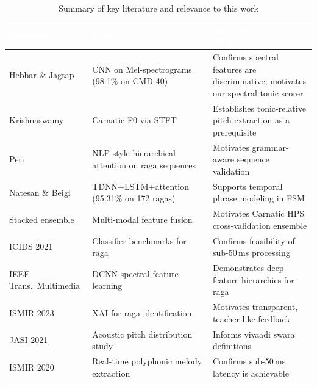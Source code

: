 \documentclass[12pt,a4paper]{report}
\numberwithin{equation}{chapter}
\begin{document}
\begin{table}[htbp]
\centering
\caption{Summary of key literature and relevance to this work}
\label{tab:lit-summary}
\setlength{\arrayrulewidth}{0.4pt}
\renewcommand{\arraystretch}{1.35}
\small
\begin{tabular}{>{\raggedright\arraybackslash}p{3.2cm}
                >{\raggedright\arraybackslash}p{3.6cm}
                >{\raggedright\arraybackslash}p{6.4cm}}
\arrayrulecolor{tableheadbg}
\toprule
\rowcolor{tableheadbg}
\textcolor{white}{\textbf{Reference}} &
\textcolor{white}{\textbf{Focus}} &
\textcolor{white}{\textbf{Relevance to this work}} \\
\midrule
\arrayrulecolor{black!15}
\rowcolor{tablerowA}
\cite{hebbar2023comparison} Hebbar \& Jagtap & CNN on Mel-spectrograms (98.1\% on CMD-40) & Confirms spectral features are discriminative; motivates our spectral tonic scorer \\
\rowcolor{tablerowB}
\cite{krishnaswamy2018application} Krishnaswamy & Carnatic F0 via STFT & Establishes tonic-relative pitch extraction as a prerequisite \\
\rowcolor{tablerowA}
\cite{peri2023applying} Peri & NLP-style hierarchical attention on raga sequences & Motivates grammar-aware sequence validation \\
\rowcolor{tablerowB}
\cite{natesan2020carnatic} Natesan \& Beigi & TDNN+LSTM+attention (95.31\% on 172 ragas) & Supports temporal phrase modeling in FSM \\
\rowcolor{tablerowA}
\cite{arxiv2022carnatic} Stacked ensemble & Multi-modal feature fusion & Motivates Carnatic HPS cross-validation ensemble \\
\rowcolor{tablerowB}
\cite{ic2021comparative} ICIDS 2021 & Classifier benchmarks for raga & Confirms feasibility of sub-50\,ms processing \\
\rowcolor{tablerowA}
\cite{ieee2022deep} IEEE Trans.\ Multimedia & DCNN spectral feature learning & Demonstrates deep feature hierarchies for raga \\
\rowcolor{tablerowB}
\cite{ismir2023explainable} ISMIR 2023 & XAI for raga identification & Motivates transparent, teacher-like feedback \\
\rowcolor{tablerowA}
\cite{jasi2021investigation} JASI 2021 & Acoustic pitch distribution study & Informs vivaadi swara definitions \\
\rowcolor{tablerowB}
\cite{ismir2020melody} ISMIR 2020 & Real-time polyphonic melody extraction & Confirms sub-50\,ms latency is achievable \\

\end{tabular}
\end{table}
\end{document}
